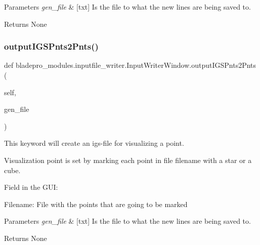 \begin{DoxyParams}{Parameters}
{\em gen\+\_\+file} & \mbox{[}txt\mbox{]} Is the file to what the new lines are being saved to. \\
\hline
\end{DoxyParams}
\begin{DoxyReturn}{Returns}
None 
\end{DoxyReturn}
\hypertarget{classbladepro__modules_1_1inputfile__writer_1_1_input_writer_window_a07862d0aa6332b54008342a24c2e30a3}{}\label{classbladepro__modules_1_1inputfile__writer_1_1_input_writer_window_a07862d0aa6332b54008342a24c2e30a3} 
\subsubsection{\texorpdfstring{output\+I\+G\+S\+Pnts2\+Pnts()}{outputIGSPnts2Pnts()}}
{\footnotesize\ttfamily def bladepro\+\_\+modules.\+inputfile\+\_\+writer.\+Input\+Writer\+Window.\+output\+I\+G\+S\+Pnts2\+Pnts (\begin{DoxyParamCaption}\item[{}]{self,  }\item[{}]{gen\+\_\+file }\end{DoxyParamCaption})}



This keyword will create an igs-\/file for visualizing a point. 

Visualization point is set by marking each point in file filename with a star or a cube.

Field in the G\+UI\+: \begin{DoxyItemize}
\item {\ttfamily Filename\+:} File with the points that are going to be marked\end{DoxyItemize}

\begin{DoxyParams}{Parameters}
{\em gen\+\_\+file} & \mbox{[}txt\mbox{]} Is the file to what the new lines are being saved to. \\
\hline
\end{DoxyParams}
\begin{DoxyReturn}{Returns}
None 
\end{DoxyReturn}
\hypertarget{classbladepro__modules_1_1inputfile__writer_1_1_input_writer_window_ada62706610465b6ba0d6fe5070cdbb9c}{}\label{classbladepro__modules_1_1inputfile__writer_1_1_input_writer_window_ada62706610465b6ba0d6fe5070cdbb9c} 
